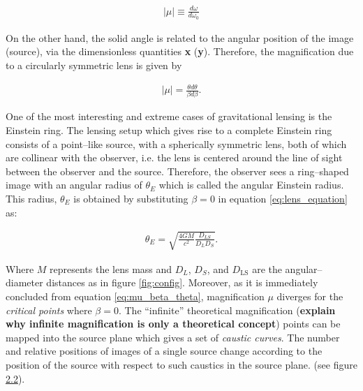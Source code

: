 \documentclass[paper=a4, fontsize=11pt]{scrartcl} %
\numberwithin{equation}{section} %
\numberwithin{figure}{section} %
\numberwithin{table}{section} %
\begin{document}
\begin{eqnarray}
\label{eq:mu_domegas}
|\mu| \equiv \frac{d\omega}{d\omega_0}
\end{eqnarray}

On the other hand, the solid angle is related to the angular position of the image (source), via the dimensionless quantities \textbf{x} (\textbf{y}). Therefore, the magnification due to a circularly symmetric lens is given by 

\begin{eqnarray}
\label{eq:mu_beta_theta}
|\mu| = \frac{\theta d\theta}{\beta d\beta}.
\end{eqnarray}

One of the most interesting and extreme cases of gravitational lensing is the Einstein ring. The lensing setup which gives rise to a complete Einstein ring consists of a point--like source, with a spherically symmetric lens, both of which are collinear with the observer, i.e. the lens is centered around the line of sight between the observer and the source. Therefore, the observer sees a ring--shaped image with an angular radius of $\theta_E$ which is called the angular Einstein radius. This radius, $\theta_E$ is obtained by substituting $\beta=0$ in equation \ref{eq:lens_equation} as:

 \begin{eqnarray}
 \theta_E = \sqrt{\frac{4GM}{c^2}\frac{D_{LS}}{D_LD_S}}.
 \label{eq:lens}
 \end{eqnarray}

 Where $M$ represents the lens mass and $D_L$, $D_S$, and $D_\mathrm{LS}$ are the angular--diameter distances as in figure \ref{fig:config}. Moreover, as it is immediately concluded from equation \ref{eq:mu_beta_theta}, magnification $\mu$ diverges for the \emph{critical points} where $\beta=0$. The ``infinite'' theoretical magnification ({\bf explain why infinite magnification is only a theoretical concept}) points can be mapped into the source plane which gives a set of \emph{caustic curves}. The number and relative positions of images of a single source change according to the position of the source with respect to such caustics in the source plane. (see figure \hyperref[fig:cusps]{2.2}).
\end{document}
